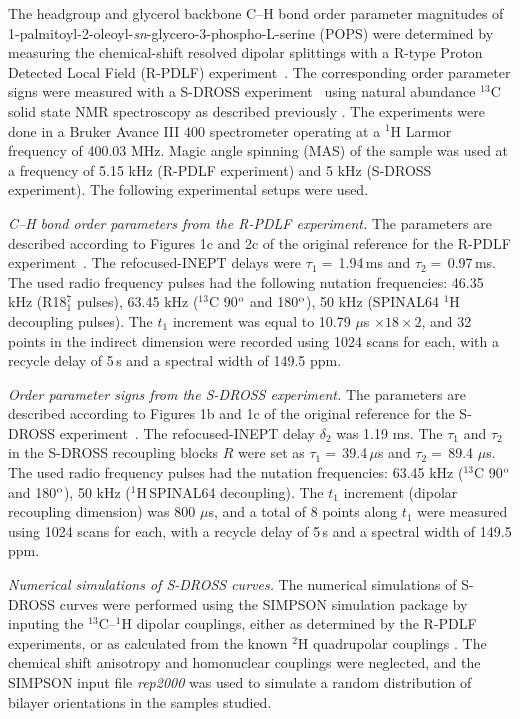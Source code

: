 \documentclass[aps,prl,superscriptaddress,twocolumn]{revtex4}
\begin{document}
The headgroup and glycerol backbone C--H bond order parameter magnitudes of 1-palmitoyl-2-oleoyl-{\it sn}-glycero-3-phospho-L-serine (POPS)
were determined by measuring the chemical-shift resolved dipolar splittings
with a R-type Proton Detected Local Field (R-PDLF) experiment~\cite{dvinskikh04}.
The corresponding order parameter signs were measured with a S-DROSS experiment~\cite{gross97}
using natural abundance $^{13}$C solid state NMR spectroscopy as described previously \cite{ferreira13,ferreira16}.
The experiments were done in a Bruker Avance III 400 spectrometer operating at a $^1$H Larmor frequency of 400.03 MHz.
Magic angle spinning (MAS) of the sample was used at a frequency of 5.15 kHz (R-PDLF experiment) and 5 kHz (S-DROSS experiment).
The following experimental setups were used.

{\emph{C--H bond order parameters from the R-PDLF experiment.}} The parameters are described according to Figures 1c and 2c of the original reference
for the R-PDLF experiment~\cite{dvinskikh04}.  The refocused-INEPT delays were $\tau_1=$\,1.94\,ms and $\tau_2=$\,0.97\,ms.
The used radio frequency pulses had the following nutation frequencies: 46.35 kHz (R18$^7_1$ pulses), 63.45 kHz ($^{13}$C 90$^{\rm{o}}$ and 180$^{\rm{o}}$),
50 kHz (SPINAL64 $^1$H decoupling pulses).
The $t_1$ increment was equal to 10.79 $\mu$s $\times18\times2$, and 32 points in the indirect
dimension were recorded using 1024 scans for each, with a recycle delay of 5\,s and a spectral width of 149.5 ppm.

\emph{Order parameter signs from the S-DROSS experiment.}
The parameters are described according to Figures 1b and 1c of the original reference for the S-DROSS
experiment~\cite{gross97}. The refocused-INEPT delay $\delta_2$ was 1.19 ms. The $\tau_1$ and $\tau_2$ in the S-DROSS recoupling
blocks $R$ were set as $\tau_1=$\,39.4\,$\mu$s and $\tau_2=$\,89.4 $\mu$s. The used radio frequency pulses had the nutation
frequencies: 63.45 kHz ($^{13}$C 90$^{\rm{o}}$ and 180$^{\rm{o}}$), 50 kHz ($^1$H\,SPINAL64 decoupling).
The $t_1$ increment (dipolar recoupling dimension) was 800 $\mu$s, and a total of 8 points along $t_1$ were
measured using 1024 scans for each, with a recycle delay of 5\,s and a spectral width of 149.5 ppm.

\emph{Numerical simulations of S-DROSS curves.}
The numerical simulations of S-DROSS curves were performed using the SIMPSON simulation package \cite{bak00}
by inputing the $^{13}$C--$^1$H
dipolar couplings, either as determined by the R-PDLF experiments, or as calculated from the known $^2$H quadrupolar couplings \cite{browning80}.
The chemical shift anisotropy and homonuclear couplings were neglected, and the SIMPSON input file {\it{rep2000}} was used to simulate a random
distribution of bilayer orientations in the samples studied.
\end{document}
